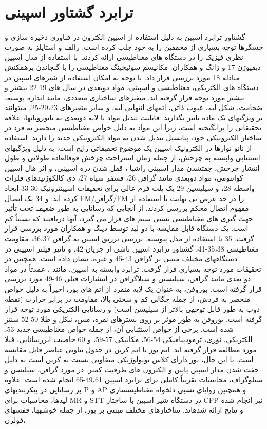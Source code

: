 \section{ترابرد گشتاور اسپینی}
گشتاور ترابرد اسپین  به دلیل استفاده از اسپین الکترون در فناوری ذخیره سازی و حسگرها توجه بسیاری از محققین را به خود جلب کرده است. رالف و استایلز به صورت نظری فیزیک  را در دستگاه های مغناطیسی ارائه کردند.  با استفاده از مدل اسپین دیفیوژن 17 و ژانگ و همکاران. مکانیسم سوئیچینگ مغناطیسی را با گنجاندن برهمکنش مبادله 18 مورد بررسی قرار داد. با توجه به امکان استفاده از شیرهای اسپین در دستگاه های الکتریکی، مغناطیسی و اسپینی، مواد دوبعدی  در سال های 19-22 بیشتر و بیشتر مورد توجه قرار گرفته اند. متغیرهای ساختاری متعددی، مانند اندازه پوسته، ضخامت، شکل لبه، عیوب ذاتی، اتمهای انتهایی لبه، و سایر متغیرهای 20،23-25، میتوانند بر ویژگیهای یک ماده تأثیر بگذارند. قابلیت تبدیل مواد با لایه دوبعدی به نانوروبانها، علاقه تحقیقاتی را برانگیخته است، زیرا این مواد به دلیل خواص مغناطیسی منحصر به فرد در ساختار الکترونیکی خود، پتانسیل تبدیل شدن به مواد الکترونیکی جدید را دارند. استفاده از نانو نوارها در الکترونیک اسپین یک موضوع تحقیقاتی رایج است. به دلیل ویژگیهای استثنایی وابسته به چرخش، از جمله زمان استراحت چرخش فوقالعاده طولانی و طول انتشار چرخش، جفتشدن مدار اسپینی راشبا ، قفل شدن دره اسپینی، و اثر هال اسپین کوانتومی، مواد دوبعدی مانند گرافن 26، فسفر سیاه  27، دی کالکوژنیدهای فلزات واسطه  28، و سیلیسین 29 یک پلت فرم عالی برای تحقیقات اسپینترونیک 30-33 ایجاد کرده اند.  و  34  یک اتصال FM/گرافن/FM را در حد عرض بی نهایت با استفاده از مفهوم اتصال محکم بررسی کردند. از آنجایی که رسانایی به طور ضعیف تحت تأثیر جهت گیری های مغناطیسی نسبی سیم های  قرار می گیرد، آنها دریافتند که  نسبتاً کم است. یک دستگاه قابل مقایسه با دو لید  توسط دینگ و همکاران مورد بررسی قرار گرفت. 35 با استفاده از مدل پیوسته. بررسی تزریق اسپین به گرافن 36،37، مقاومت مغناطیسی  35،38-41، گشتاور ترابرد اسپین ناشی از جریان  42، و تأثیر فیلتر اسپینی در دستگاههای مختلف مبتنی بر گرافن 43-45 و غیره، نشان داده است. همچنین در تحقیقات مورد توجه بسیاری قرار گرفت. ترابرد وابسته به اسپین، مانند ، عمدتاً در مواد دو بعدی مانند گرافن، سیلیسین و سیلاگرافن در انتشارات قبلی 46-49 مورد بررسی قرار گرفته است. بوروفن، به عنوان یک لایه منفرد از اتم های بور، اخیراً به دلیل خواص منحصر به فردش، از جمله چگالی کم و سختی بالا، مقاومت در برابر حرارت (نقطه ذوب به طور قابل توجهی بالاتر از سیلیسن است) و رسانایی الکتریکی مورد توجه قرار گرفته است. بوروفن به طور موثر بر روی بسترهای نقره، مس، نیکل و طلا 50-52 سنتز شده است. برخی از خواص استثنایی آن، از جمله خواص مغناطیسی جدید 53، الکتریکی، نوری، ترمودینامیکی 54-56، مکانیکی 57-59، و 60 خاصیت ابررسانایی، قبلا مورد مطالعه قرار گرفته اند. اتم بور با اتم کربن در جدول تناوبی عناصر قابل مقایسه است. با این حال، بور دارای کلاس توپولوژیکی متفاوتی نسبت به کربن است به دلیل جفت شدن مدار اسپین پایین  و الکترون های ظرفیت کمتر. در مورد گرافن، سیلیسن و سیلوگراف، محاسبات تقریباً کاملی برای ترابرد اسپین 49،61-65 انجام شده است. علاوه بر رسانایی در پیکربندیهای P و AP و همچنین زوایای نسبی دلخواه مغناطیسسازی لیدها، محاسبات برای MR و STT در دستگاه شیر اسپین با ساختار CPP نیز انجام شده و نتایج ارائه شدهاند. ساختارهای مختلف مبتنی بر بور، از جمله خوشهها، قفسهای فولرن، 